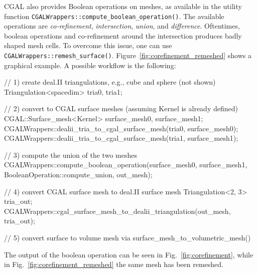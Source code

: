 \documentclass{ansarticle-preprint}
\begin{document}
CGAL also provides Boolean operations on meshes, as available in the
utility function
\texttt{CGALWrappers::\allowbreak{}compute\_boolean\_operation()}. The
available operations are \textit{co-refinement}, \textit{intersection},
\textit{union}, and \textit{difference}. Oftentimes, boolean
operations and co-refinement around the intersection produces
badly shaped mesh cells. To overcome this issue, one can use \texttt{CGALWrappers::\allowbreak{}remesh\_surface()}. Figure~\ref{fig:corefinement_remeshed} shows a graphical example.
A possible workflow is the following:
\begin{c++}
// 1) create deal.II triangulations, e.g., cube and sphere (not shown)  
Triangulation<spacedim> tria0, tria1;

// 2) convert to CGAL surface meshes (assuming Kernel is already defined) 
CGAL::Surface_mesh<Kernel> surface_mesh0, surface_mesh1;
CGALWrappers::dealii_tria_to_cgal_surface_mesh(tria0, surface_mesh0);
CGALWrappers::dealii_tria_to_cgal_surface_mesh(tria1, surface_mesh1);

// 3) compute the union of the two meshes
CGALWrappers::compute_boolean_operation(surface_mesh0, surface_mesh1,
  BooleanOperation::compute_union, out_mesh);

// 4) convert CGAL surface mesh to deal.II surface mesh
Triangulation<2, 3> tria_out;
CGALWrappers::cgal_surface_mesh_to_dealii_triangulation(out_mesh, tria_out);

// 5) convert surface to volume mesh via surface_mesh_to_volumetric_mesh()
\end{c++}
The output of the boolean operation can be seen in Fig.~\ref{fig:corefinement}, while in Fig.~\ref{fig:corefinement_remeshed}
the same mesh has been remeshed.
\end{document}
